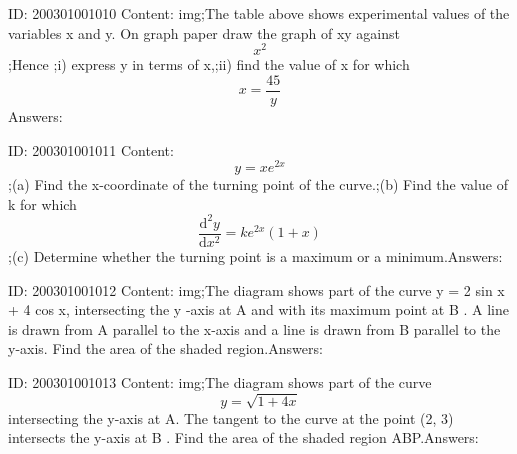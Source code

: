 \documentclass{article}
\begin{document}
ID: 200301001010
Content:
img;The table above shows experimental values of the variables x and y. On graph paper draw the graph of xy against $$x^2$$;Hence ;i) express y in terms of x,;ii) find the value of x for which $$x=\frac{45}{y}$$Answers:

ID: 200301001011
Content:
$$y=xe^{2x}$$;(a)	Find the x-coordinate of the turning point of the curve.;(b)	Find the value of k for which $$\frac{\mathrm{d} ^{2}y}{\mathrm{d} x^{2}}=ke^{2x}(1+x)$$;(c)	Determine whether the turning point is a maximum or a minimum.Answers:

ID: 200301001012
Content:
img;The diagram shows part of the curve y = 2 sin  x + 4 cos  x, intersecting the y -axis at A and with its maximum point at B . A line is drawn from A parallel to the x-axis and a line is drawn from B parallel to the y-axis. Find the area of the shaded region.Answers:

ID: 200301001013
Content:
img;The diagram shows part of the curve $$y=\sqrt{1+4x}$$ intersecting the y-axis at A. The tangent to the curve at the point (2, 3) intersects the y-axis at B . Find the area of the shaded region ABP.Answers:
\end{document}
